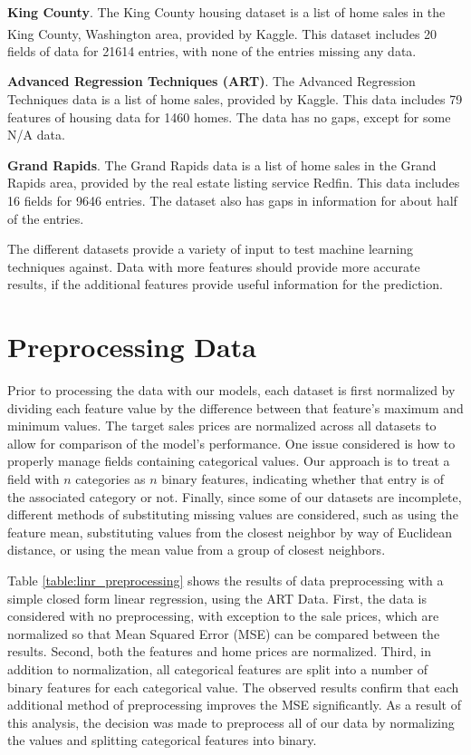 \documentclass[10pt]{article}
\begin{document}
\begin{multicols}{2}
		\textbf{King County}. The King County housing dataset is a list of home sales in the King County, Washington area, provided by Kaggle\textsuperscript{\cite{kc_data}}. This dataset includes 20 fields of data for 21614 entries, with none of the entries missing any data.
		\par
		\textbf{Advanced Regression Techniques (ART)}. The Advanced Regression Techniques data is a list of home sales, provided by Kaggle. This data includes 79 features of housing data for 1460 homes. The data has no gaps, except for some N/A data.
		\par
		\textbf{Grand Rapids}. The Grand Rapids data is a list of home sales in the Grand Rapids area, provided by the real estate listing service Redfin. This data includes 16 fields for 9646 entries. The dataset also has gaps in information for about half of the entries.
		\par
		The different datasets provide a variety of input to test machine learning techniques against. Data with more features should provide more accurate results, if the additional features provide useful information for the prediction.
		
		\section{Preprocessing Data}
		Prior to processing the data with our models, each dataset is first normalized by dividing each feature value by the difference between that feature's maximum and minimum values. The target sales prices are normalized across all datasets to allow for comparison of the model's performance. One issue considered is how to properly manage fields containing categorical values. Our approach is to treat a field with \(n\) categories as \(n\) binary features, indicating whether that entry is of the associated category or not. Finally, since some of our datasets are incomplete, different methods of substituting missing values are considered, such as using the feature mean, substituting values from the closest neighbor by way of Euclidean distance, or using the mean value from a group of closest neighbors.

        Table \ref{table:linr_preprocessing} shows the results of data preprocessing with a simple closed form linear regression, using the ART Data. First, the data is considered with no preprocessing, with exception to the sale prices, which are normalized so that Mean Squared Error (MSE) can be compared between the results. Second, both the features and home prices are normalized. Third, in addition to normalization, all categorical features are split into a number of binary features for each categorical value. The observed results confirm that each additional method of preprocessing improves the MSE significantly. As a result of this analysis, the decision was made to preprocess all of our data by normalizing the values and splitting categorical features into binary.
        

\end{multicols}
\end{document}
